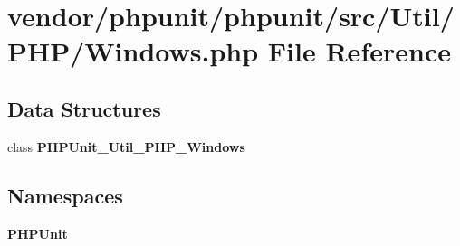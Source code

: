 \section{vendor/phpunit/phpunit/src/\+Util/\+P\+H\+P/\+Windows.php File Reference}
\label{_windows_8php}
\subsection*{Data Structures}
\begin{DoxyCompactItemize}
\item 
class {\bf P\+H\+P\+Unit\+\_\+\+Util\+\_\+\+P\+H\+P\+\_\+\+Windows}
\end{DoxyCompactItemize}
\subsection*{Namespaces}
\begin{DoxyCompactItemize}
\item 
 {\bf P\+H\+P\+Unit}
\end{DoxyCompactItemize}
